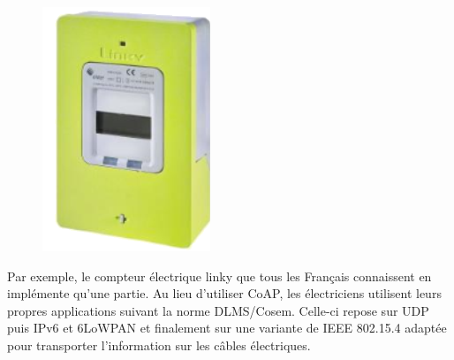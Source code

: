    \begin{figure}
\centerline{\includegraphics[width=.4\columnwidth]{Pictures/linky.png}}
\end{figure}

Par exemple, le compteur électrique linky que tous les Français connaissent en implémente qu'une partie. Au lieu d'utiliser CoAP, les électriciens utilisent leurs propres applications suivant la norme DLMS/Cosem. Celle-ci repose sur UDP puis IPv6 et 6LoWPAN et finalement sur une variante de IEEE 802.15.4 adaptée pour transporter l'information sur les câbles électriques.

